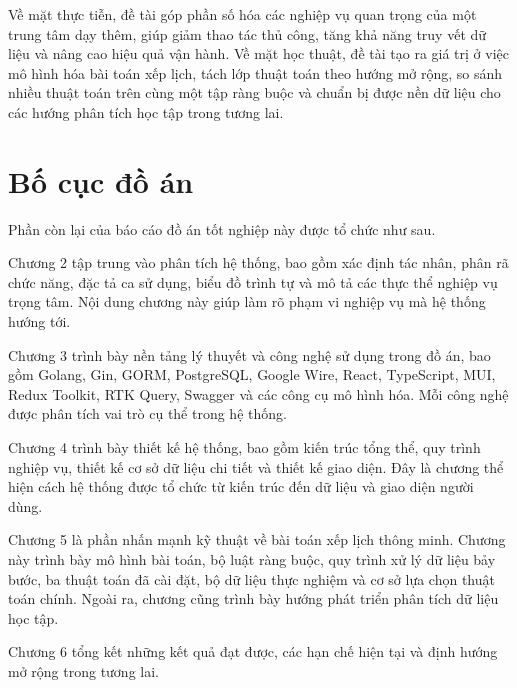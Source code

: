 \documentclass[../DoAn.tex]{subfiles}
\begin{document}
Về mặt thực tiễn, đề tài góp phần số hóa các nghiệp vụ quan trọng của một trung tâm dạy thêm, giúp giảm thao tác thủ công, tăng khả năng truy vết dữ liệu và nâng cao hiệu quả vận hành. Về mặt học thuật, đề tài tạo ra giá trị ở việc mô hình hóa bài toán xếp lịch, tách lớp thuật toán theo hướng mở rộng, so sánh nhiều thuật toán trên cùng một tập ràng buộc và chuẩn bị được nền dữ liệu cho các hướng phân tích học tập trong tương lai.

\section{Bố cục đồ án}
\label{section:1.4}
Phần còn lại của báo cáo đồ án tốt nghiệp này được tổ chức như sau.

Chương 2 tập trung vào phân tích hệ thống, bao gồm xác định tác nhân, phân rã chức năng, đặc tả ca sử dụng, biểu đồ trình tự và mô tả các thực thể nghiệp vụ trọng tâm. Nội dung chương này giúp làm rõ phạm vi nghiệp vụ mà hệ thống hướng tới.

Chương 3 trình bày nền tảng lý thuyết và công nghệ sử dụng trong đồ án, bao gồm Golang, Gin, GORM, PostgreSQL, Google Wire, React, TypeScript, MUI, Redux Toolkit, RTK Query, Swagger và các công cụ mô hình hóa. Mỗi công nghệ được phân tích vai trò cụ thể trong hệ thống.

Chương 4 trình bày thiết kế hệ thống, bao gồm kiến trúc tổng thể, quy trình nghiệp vụ, thiết kế cơ sở dữ liệu chi tiết và thiết kế giao diện. Đây là chương thể hiện cách hệ thống được tổ chức từ kiến trúc đến dữ liệu và giao diện người dùng.

Chương 5 là phần nhấn mạnh kỹ thuật về bài toán xếp lịch thông minh. Chương này trình bày mô hình bài toán, bộ luật ràng buộc, quy trình xử lý dữ liệu bảy bước, ba thuật toán đã cài đặt, bộ dữ liệu thực nghiệm và cơ sở lựa chọn thuật toán chính. Ngoài ra, chương cũng trình bày hướng phát triển phân tích dữ liệu học tập.

Chương 6 tổng kết những kết quả đạt được, các hạn chế hiện tại và định hướng mở rộng trong tương lai.
\end{document}
